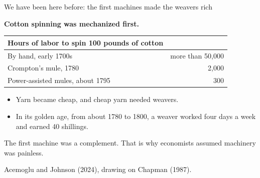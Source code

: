 \documentclass[aspectratio=169,11pt]{beamer}
\begin{document}
\begin{frame}{We have been here before: the first machines made the weavers rich}

\textbf{Cotton spinning was mechanized first.}

\vspace{0.0cm}

\begin{center}
\footnotesize
\begin{tabular}{@{}lr@{}}
\toprule
\textbf{Hours of labor to spin 100 pounds of cotton} & \\
\midrule
By hand, early 1700s & more than 50,000 \\
Crompton's mule, 1780 & 2,000 \\
Power-assisted mules, about 1795 & 300 \\
\bottomrule
\end{tabular}
\end{center}

\vspace{0.05cm}

\begin{itemize}\setlength\itemsep{0.25em}
    \item Yarn became cheap, and cheap yarn needed weavers.
    \item In its golden age, from about 1780 to 1800, a weaver worked four days a week and earned 40 shillings.
\end{itemize}

\vspace{0.1cm}

\alert{The first machine was a complement. That is why economists assumed machinery was painless.}

\vspace{0.05cm}
{\scriptsize\color{warmgray}Acemoglu and Johnson (2024), drawing on Chapman (1987).}

\end{frame}
\end{document}
